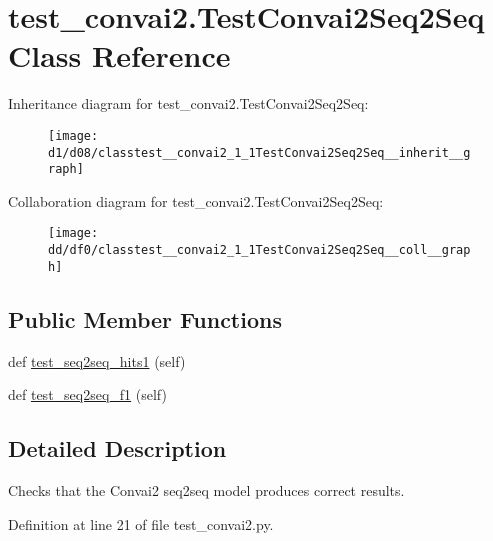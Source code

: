 \hypertarget{classtest__convai2_1_1TestConvai2Seq2Seq}{}\section{test\+\_\+convai2.\+Test\+Convai2\+Seq2\+Seq Class Reference}
\label{classtest__convai2_1_1TestConvai2Seq2Seq}


Inheritance diagram for test\+\_\+convai2.\+Test\+Convai2\+Seq2\+Seq\+:\nopagebreak
\begin{figure}[H]
\begin{center}
\leavevmode
\texttt{[image: d1/d08/classtest\_\_convai2\_1\_1TestConvai2Seq2Seq\_\_inherit\_\_graph]}
\end{center}
\end{figure}


Collaboration diagram for test\+\_\+convai2.\+Test\+Convai2\+Seq2\+Seq\+:\nopagebreak
\begin{figure}[H]
\begin{center}
\leavevmode
\texttt{[image: dd/df0/classtest\_\_convai2\_1\_1TestConvai2Seq2Seq\_\_coll\_\_graph]}
\end{center}
\end{figure}
\subsection*{Public Member Functions}
\begin{DoxyCompactItemize}
\item 
def \hyperlink{classtest__convai2_1_1TestConvai2Seq2Seq_ae1f1ed9b54523ecf62a983e6d0ae1bb2}{test\+\_\+seq2seq\+\_\+hits1} (self)
\item 
def \hyperlink{classtest__convai2_1_1TestConvai2Seq2Seq_af92bc095f0d62a64388b736f06b003a6}{test\+\_\+seq2seq\+\_\+f1} (self)
\end{DoxyCompactItemize}


\subsection{Detailed Description}
\begin{DoxyVerb}Checks that the Convai2 seq2seq model produces correct results.
\end{DoxyVerb}
 

Definition at line 21 of file test\+\_\+convai2.\+py.



